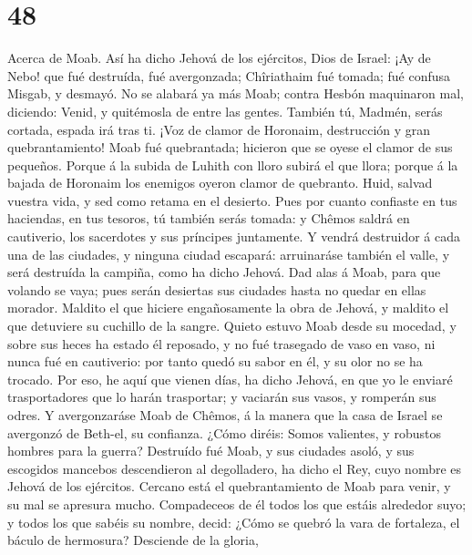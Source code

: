 \hypertarget{section-47}{%
\section{48}\label{section-47}}

 Acerca de Moab. Así ha dicho Jehová de los ejércitos, Dios
de Israel: ¡Ay de Nebo! que fué destruída, fué avergonzada; Chîriathaim
fué tomada; fué confusa Misgab, y desmayó.  No se alabará ya
más Moab; contra Hesbón maquinaron mal, diciendo: Venid, y quitémosla de
entre las gentes. También tú, Madmén, serás cortada, espada irá tras ti.
 ¡Voz de clamor de Horonaim, destrucción y gran
quebrantamiento!  Moab fué quebrantada; hicieron que se
oyese el clamor de sus pequeños.  Porque á la subida de
Luhith con lloro subirá el que llora; porque á la bajada de Horonaim los
enemigos oyeron clamor de quebranto.  Huid, salvad vuestra
vida, y sed como retama en el desierto.  Pues por cuanto
confiaste en tus haciendas, en tus tesoros, tú también serás tomada: y
Chêmos saldrá en cautiverio, los sacerdotes y sus príncipes juntamente.
 Y vendrá destruidor á cada una de las ciudades, y ninguna
ciudad escapará: arruinaráse también el valle, y será destruída la
campiña, como ha dicho Jehová.  Dad alas á Moab, para que
volando se vaya; pues serán desiertas sus ciudades hasta no quedar en
ellas morador.  Maldito el que hiciere engañosamente la
obra de Jehová, y maldito el que detuviere su cuchillo de la sangre.
 Quieto estuvo Moab desde su mocedad, y sobre sus heces ha
estado él reposado, y no fué trasegado de vaso en vaso, ni nunca fué en
cautiverio: por tanto quedó su sabor en él, y su olor no se ha trocado.
 Por eso, he aquí que vienen días, ha dicho Jehová, en que
yo le enviaré trasportadores que lo harán trasportar; y vaciarán sus
vasos, y romperán sus odres.  Y avergonzaráse Moab de
Chêmos, á la manera que la casa de Israel se avergonzó de Beth-el, su
confianza.  ¿Cómo diréis: Somos valientes, y robustos
hombres para la guerra?  Destruído fué Moab, y sus ciudades
asoló, y sus escogidos mancebos descendieron al degolladero, ha dicho el
Rey, cuyo nombre es Jehová de los ejércitos.  Cercano está
el quebrantamiento de Moab para venir, y su mal se apresura mucho.
 Compadeceos de él todos los que estáis alrededor suyo; y
todos los que sabéis su nombre, decid: ¿Cómo se quebró la vara de
fortaleza, el báculo de hermosura?  Desciende de la gloria,
